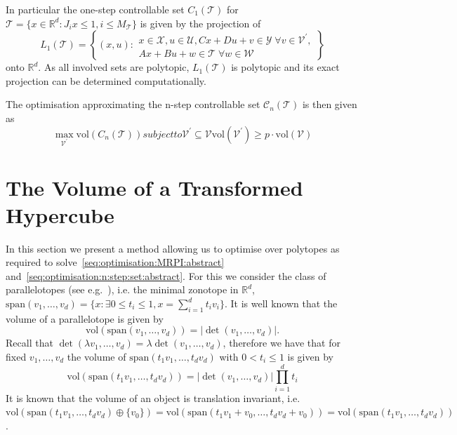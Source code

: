 \documentclass{ifacconf}
\providecommand{\abs}[1]{\left|#1\right|}
\providecommand{\vol}{\text{vol}}
\providecommand{\spann}{\text{span}}
\providecommand{\C}{\mathcal C}
\providecommand{\W}{\mathcal W}
\providecommand{\V}{\mathcal V}
\providecommand{\X}{\mathcal X}
\providecommand{\Y}{\mathcal Y}
\providecommand{\U}{\mathcal U}
\providecommand{\T}{\mathcal T}
\providecommand{\RR}{\mathbb R}
\begin{document}
In particular the one-step controllable set $C_1(\T)$ for $\T = \{x\in\RR^d:J_i x\leq1,i\leq M_\T\}$ is given by the projection of 
%
\begin{equation}
	L_1(\T) = \left\{(x,u):\begin{aligned}
	x\in\X, u\in\U, Cx+Du + v\in\Y\;\forall v\in\V^\prime,\\
	Ax+Bu+w\in\T\;\forall w\in\W
	\end{aligned}\right\}
\end{equation}
%
onto $\RR^d$.
%
As all involved sets are polytopic, $L_1(\T)$ is polytopic and its exact projection can be determined computationally.

The optimisation approximating the n-step controllable set $\C_n(\T)$ is then given as
%
\begin{subequations}\label{seq:optimisation:n:step:set:abstract}
	\begin{equation}
		\max_{\V^\prime} \vol(C_n(\T))
	\end{equation}
	subject to
	\begin{equation}
	\V^\prime\subseteq\V
\end{equation}
%
\begin{equation}
	\vol(\V^\prime)\geq p\cdot\vol(\V)
\end{equation}
\end{subequations}



\section{The Volume of a Transformed Hypercube}\label{sec:volume:of:hypercube}
%
%
In this section we present a method allowing us to optimise over polytopes as required to solve~\eqref{seq:optimisation:MRPI:abstract} and~\eqref{seq:optimisation:n:step:set:abstract}.
%
For this we consider the class of parallelotopes (see e.g.~\cite{Coxeter:1973}), i.e. the minimal zonotope in $\RR^d$, $\spann(v_1,\dots,v_d) = \{x:\exists 0\leq t_i\leq1, x = \sum_{i=1}^d t_iv_i\}$.
%
It is well known that the volume of a parallelotope is given by
%
\begin{equation}
	\vol(\spann(v_1,\dots,v_d)) = \abs{\det(v_1,\dots,v_d)}.
\end{equation}
%
Recall that $\det(\lambda v_1,\dots,v_d) = \lambda\det(v_1,\dots,v_d)$, therefore we have that for fixed $v_1,\dots,v_d$ the volume of $\spann(t_1v_1,\dots,t_dv_d)$ with $0<t_i\leq1$ is given by
%
\begin{equation}
	\vol(\spann(t_1v_1,\dots,t_dv_d)) = \abs{\det(v_1,\dots,v_d)}\prod_{i=1}^d t_i
\end{equation}
%
It is known that the volume of an object is translation invariant, i.e. $\vol(\spann(t_1v_1,\dots,t_dv_d)\oplus\{v_0\}) = \vol(\spann(t_1v_1+v_0,\dots,t_dv_d+v_0)) = \vol(\spann(t_1v_1,\dots,t_dv_d))$.
\end{document}
